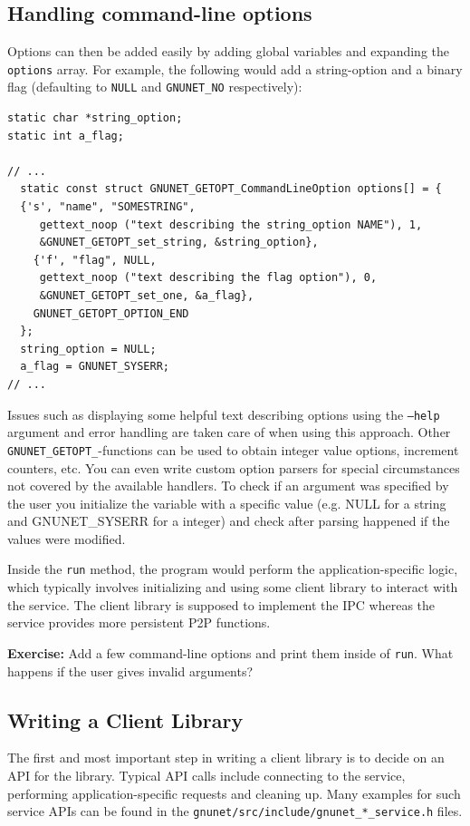 \documentclass[10pt]{article}
\newcommand{\exercise}[1]{\noindent\begin{boxedminipage}{\textwidth}{\bf Exercise:} #1 \end{boxedminipage}}
\begin{document}
\subsection{Handling command-line options}

Options can then be added easily by adding global variables and
expanding the {\tt options} array.  For example, the following would
add a string-option and a binary flag (defaulting to {\tt NULL} and
{\tt GNUNET\_NO} respectively):

\lstset{language=C}
\begin{lstlisting}
static char *string_option;
static int a_flag;

// ...
  static const struct GNUNET_GETOPT_CommandLineOption options[] = {
  {'s', "name", "SOMESTRING",
     gettext_noop ("text describing the string_option NAME"), 1,
     &GNUNET_GETOPT_set_string, &string_option},
    {'f', "flag", NULL,
     gettext_noop ("text describing the flag option"), 0,
     &GNUNET_GETOPT_set_one, &a_flag},
    GNUNET_GETOPT_OPTION_END
  };
  string_option = NULL;
  a_flag = GNUNET_SYSERR;
// ...
\end{lstlisting}

Issues such as displaying some helpful text describing options using
the {\tt --help} argument and error handling are taken care of when
using this approach.  Other {\tt GNUNET\_GETOPT\_}-functions can be used
to obtain integer value options, increment counters, etc.  You can
even write custom option parsers for special circumstances not covered
by the available handlers. To check if an argument was specified by the
user you initialize the variable with a specific value (e.g. NULL for
a string and GNUNET\_SYSERR for a integer) and check after parsing
happened if the values were modified.

Inside the {\tt run} method, the program would perform the
application-specific logic, which typically involves initializing and
using some client library to interact with the service.  The client
library is supposed to implement the IPC whereas the service provides
more persistent P2P functions.

\exercise{Add a few command-line options and print them inside
of {\tt run}.  What happens if the user gives invalid arguments?}

\subsection{Writing a Client Library}

The first and most important step in writing a client library is to
decide on an API for the library.  Typical API calls include
connecting to the service, performing application-specific requests
and cleaning up.  Many examples for such service APIs can be found
in the {\tt gnunet/src/include/gnunet\_*\_service.h} files.
\end{document}
